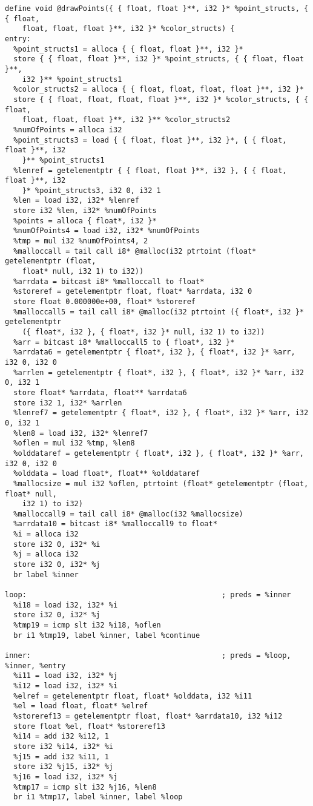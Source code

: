 \documentclass[main.tex]{subfiles}
\begin{document}
{\begin{lstlisting}
define void @drawPoints({ { float, float }**, i32 }* %point_structs, { { float, 
    float, float, float }**, i32 }* %color_structs) {
entry:
  %point_structs1 = alloca { { float, float }**, i32 }*
  store { { float, float }**, i32 }* %point_structs, { { float, float }**, 
    i32 }** %point_structs1
  %color_structs2 = alloca { { float, float, float, float }**, i32 }*
  store { { float, float, float, float }**, i32 }* %color_structs, { { float,
    float, float, float }**, i32 }** %color_structs2
  %numOfPoints = alloca i32
  %point_structs3 = load { { float, float }**, i32 }*, { { float, float }**, i32 
    }** %point_structs1
  %lenref = getelementptr { { float, float }**, i32 }, { { float, float }**, i32
    }* %point_structs3, i32 0, i32 1
  %len = load i32, i32* %lenref
  store i32 %len, i32* %numOfPoints
  %points = alloca { float*, i32 }*
  %numOfPoints4 = load i32, i32* %numOfPoints
  %tmp = mul i32 %numOfPoints4, 2
  %malloccall = tail call i8* @malloc(i32 ptrtoint (float* getelementptr (float,
    float* null, i32 1) to i32))
  %arrdata = bitcast i8* %malloccall to float*
  %storeref = getelementptr float, float* %arrdata, i32 0
  store float 0.000000e+00, float* %storeref
  %malloccall5 = tail call i8* @malloc(i32 ptrtoint ({ float*, i32 }* getelementptr
    ({ float*, i32 }, { float*, i32 }* null, i32 1) to i32))
  %arr = bitcast i8* %malloccall5 to { float*, i32 }*
  %arrdata6 = getelementptr { float*, i32 }, { float*, i32 }* %arr, i32 0, i32 0
  %arrlen = getelementptr { float*, i32 }, { float*, i32 }* %arr, i32 0, i32 1
  store float* %arrdata, float** %arrdata6
  store i32 1, i32* %arrlen
  %lenref7 = getelementptr { float*, i32 }, { float*, i32 }* %arr, i32 0, i32 1
  %len8 = load i32, i32* %lenref7
  %oflen = mul i32 %tmp, %len8
  %olddataref = getelementptr { float*, i32 }, { float*, i32 }* %arr, i32 0, i32 0
  %olddata = load float*, float** %olddataref
  %mallocsize = mul i32 %oflen, ptrtoint (float* getelementptr (float, float* null,
    i32 1) to i32)
  %malloccall9 = tail call i8* @malloc(i32 %mallocsize)
  %arrdata10 = bitcast i8* %malloccall9 to float*
  %i = alloca i32
  store i32 0, i32* %i
  %j = alloca i32
  store i32 0, i32* %j
  br label %inner

loop:                                             ; preds = %inner
  %i18 = load i32, i32* %i
  store i32 0, i32* %j
  %tmp19 = icmp slt i32 %i18, %oflen
  br i1 %tmp19, label %inner, label %continue

inner:                                            ; preds = %loop, %inner, %entry
  %i11 = load i32, i32* %j
  %i12 = load i32, i32* %i
  %elref = getelementptr float, float* %olddata, i32 %i11
  %el = load float, float* %elref
  %storeref13 = getelementptr float, float* %arrdata10, i32 %i12
  store float %el, float* %storeref13
  %i14 = add i32 %i12, 1
  store i32 %i14, i32* %i
  %j15 = add i32 %i11, 1
  store i32 %j15, i32* %j
  %j16 = load i32, i32* %j
  %tmp17 = icmp slt i32 %j16, %len8
  br i1 %tmp17, label %inner, label %loop


\end{lstlisting}}
\end{document}
